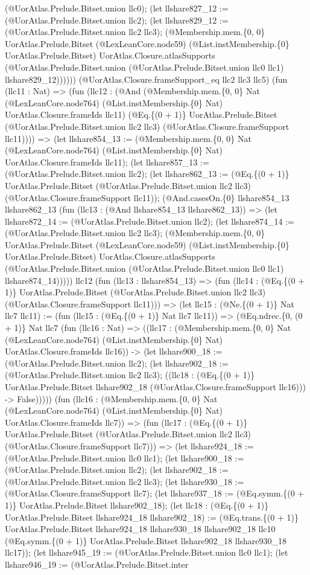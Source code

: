 \documentclass[11pt]{article}
\begin{document}
(@UorAtlas.Prelude.Bitset.union llc0); (let llshare827\_12 := (@UorAtlas.Prelude.Bitset.union llc2); (let llshare829\_12 := (@UorAtlas.Prelude.Bitset.union llc2 llc3); (@Membership.mem.\{0, 0\} UorAtlas.Prelude.Bitset (@LexLeanCore.node59) (@List.instMembership.\{0\} UorAtlas.Prelude.Bitset) UorAtlas.Closure.atlasSupports (@UorAtlas.Prelude.Bitset.union (@UorAtlas.Prelude.Bitset.union llc0 llc1) llshare829\_12)))))) (@UorAtlas.Closure.frameSupport\_eq llc2 llc3 llc5) (fun (llc11 : Nat) => (fun (llc12 : (@And (@Membership.mem.\{0, 0\} Nat (@LexLeanCore.node764) (@List.instMembership.\{0\} Nat) UorAtlas.Closure.frameIds llc11) (@Eq.\{(0 + 1)\} UorAtlas.Prelude.Bitset (@UorAtlas.Prelude.Bitset.union llc2 llc3) (@UorAtlas.Closure.frameSupport llc11)))) => (let llshare854\_13 := (@Membership.mem.\{0, 0\} Nat (@LexLeanCore.node764) (@List.instMembership.\{0\} Nat) UorAtlas.Closure.frameIds llc11); (let llshare857\_13 := (@UorAtlas.Prelude.Bitset.union llc2); (let llshare862\_13 := (@Eq.\{(0 + 1)\} UorAtlas.Prelude.Bitset (@UorAtlas.Prelude.Bitset.union llc2 llc3) (@UorAtlas.Closure.frameSupport llc11)); (@And.casesOn.\{0\} llshare854\_13 llshare862\_13 (fun (llc13 : (@And llshare854\_13 llshare862\_13)) => (let llshare872\_14 := (@UorAtlas.Prelude.Bitset.union llc2); (let llshare874\_14 := (@UorAtlas.Prelude.Bitset.union llc2 llc3); (@Membership.mem.\{0, 0\} UorAtlas.Prelude.Bitset (@LexLeanCore.node59) (@List.instMembership.\{0\} UorAtlas.Prelude.Bitset) UorAtlas.Closure.atlasSupports (@UorAtlas.Prelude.Bitset.union (@UorAtlas.Prelude.Bitset.union llc0 llc1) llshare874\_14))))) llc12 (fun (llc13 : llshare854\_13) => (fun (llc14 : (@Eq.\{(0 + 1)\} UorAtlas.Prelude.Bitset (@UorAtlas.Prelude.Bitset.union llc2 llc3) (@UorAtlas.Closure.frameSupport llc11))) => (let llc15 : (@Ne.\{(0 + 1)\} Nat llc7 llc11) := (fun (llc15 : (@Eq.\{(0 + 1)\} Nat llc7 llc11)) => (@Eq.ndrec.\{0, (0 + 1)\} Nat llc7 (fun (llc16 : Nat) => ((llc17 : (@Membership.mem.\{0, 0\} Nat (@LexLeanCore.node764) (@List.instMembership.\{0\} Nat) UorAtlas.Closure.frameIds llc16)) -> (let llshare900\_18 := (@UorAtlas.Prelude.Bitset.union llc2); (let llshare902\_18 := (@UorAtlas.Prelude.Bitset.union llc2 llc3); ((llc18 : (@Eq.\{(0 + 1)\} UorAtlas.Prelude.Bitset llshare902\_18 (@UorAtlas.Closure.frameSupport llc16))) -> False))))) (fun (llc16 : (@Membership.mem.\{0, 0\} Nat (@LexLeanCore.node764) (@List.instMembership.\{0\} Nat) UorAtlas.Closure.frameIds llc7)) => (fun (llc17 : (@Eq.\{(0 + 1)\} UorAtlas.Prelude.Bitset (@UorAtlas.Prelude.Bitset.union llc2 llc3) (@UorAtlas.Closure.frameSupport llc7))) => (let llshare924\_18 := (@UorAtlas.Prelude.Bitset.union llc0 llc1); (let llshare900\_18 := (@UorAtlas.Prelude.Bitset.union llc2); (let llshare902\_18 := (@UorAtlas.Prelude.Bitset.union llc2 llc3); (let llshare930\_18 := (@UorAtlas.Closure.frameSupport llc7); (let llshare937\_18 := (@Eq.symm.\{(0 + 1)\} UorAtlas.Prelude.Bitset llshare902\_18); (let llc18 : (@Eq.\{(0 + 1)\} UorAtlas.Prelude.Bitset llshare924\_18 llshare902\_18) := (@Eq.trans.\{(0 + 1)\} UorAtlas.Prelude.Bitset llshare924\_18 llshare930\_18 llshare902\_18 llc10 (@Eq.symm.\{(0 + 1)\} UorAtlas.Prelude.Bitset llshare902\_18 llshare930\_18 llc17)); (let llshare945\_19 := (@UorAtlas.Prelude.Bitset.union llc0 llc1); (let llshare946\_19 := (@UorAtlas.Prelude.Bitset.inter 
\end{document}
